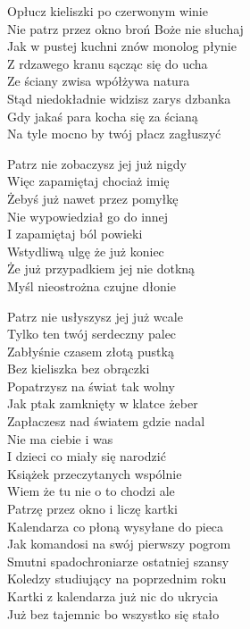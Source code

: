 \begin{text}
    Opłucz kieliszki po czerwonym winie\\
    Nie patrz przez okno broń Boże nie słuchaj\\
    Jak w pustej kuchni znów monolog płynie\\
    Z rdzawego kranu sącząc się do ucha\\
    Ze ściany zwisa wpółżywa natura\\
    Stąd niedokładnie widzisz zarys dzbanka\\
    Gdy jakaś para kocha się za ścianą\\
    Na tyle mocno by twój płacz zagłuszyć

    Patrz nie zobaczysz jej już nigdy\\
    Więc zapamiętaj chociaż imię\\
    Żebyś już nawet przez pomyłkę\\
    Nie wypowiedział go do innej\\
    I zapamiętaj ból powieki\\
    Wstydliwą ulgę że już koniec\\
    Że już przypadkiem jej nie dotkną\\
    Myśl nieostrożna czujne dłonie

    Patrz nie usłyszysz jej już wcale\\
    Tylko ten twój serdeczny palec\\
    Zabłyśnie czasem złotą pustką\\
    Bez kieliszka bez obrączki\\
    Popatrzysz na świat tak wolny\\
    Jak ptak zamknięty w klatce żeber\\
    Zapłaczesz nad światem gdzie nadal\\
    Nie ma ciebie i was\\
    I dzieci co miały się narodzić\\
    Książek przeczytanych wspólnie\\
    Wiem że tu nie o to chodzi ale\\
    Patrzę przez okno i liczę kartki\\
    Kalendarza co płoną wysyłane do pieca\\
    Jak komandosi na swój pierwszy pogrom\\
    Smutni spadochroniarze ostatniej szansy\\
    Koledzy studiujący na poprzednim roku\\
    Kartki z kalendarza już nic do ukrycia\\
    Już bez tajemnic bo wszystko się stało


\end{text}
